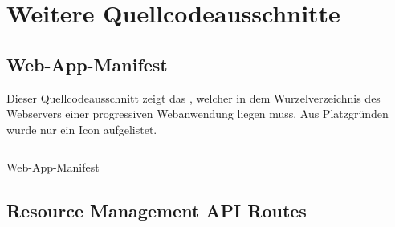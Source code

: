 \chapter{Weitere Quellcodeausschnitte}
\label{chap:weiterequellcodeausschnitte}

\section*{Web-App-Manifest}
\label{sec:webappmanifest}
Dieser Quellcodeausschnitt zeigt das , welcher in dem Wurzelverzeichnis
des Webservers einer progressiven Webanwendung liegen muss. Aus Platzgründen wurde nur ein
Icon aufgelistet.
\begin{listing}[h]
    \inputminted{jsx}{snippets/json/manifest.json}
    \caption{Web-App-Manifest}
    \label{lst:webappmanifest}
\end{listing}

\newpage

\section*{Resource Management API Routes}
\label{sec:resourcemanagementapiroutes}

